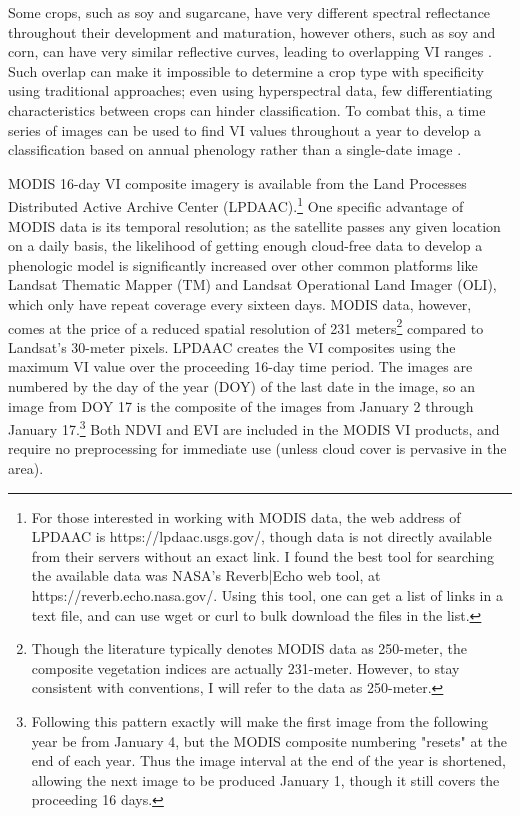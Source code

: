 Some crops, such as soy and sugarcane, have very different spectral reflectance throughout their development and maturation, however others, such as soy and corn, can have very similar reflective curves, leading to overlapping VI ranges \autocite{price1994how-unique}. Such overlap can make it impossible to determine a crop type with specificity using traditional approaches; even using hyperspectral data, few differentiating characteristics between crops can hinder classification. To combat this, a time series of images can be used to find VI values throughout a year to develop a classification based on annual phenology rather than a single-date image \autocites{gu2010phenological}{wardlow2002discriminating}{wardlow2005state-level}{wardlow2007analysis}{wardlow2008large-area}{zhang2003monitoring}.
	
MODIS 16-day VI composite imagery is available from the Land Processes Distributed Active Archive Center (LPDAAC).\footnote{For those interested in working with MODIS data, the web address of LPDAAC is https://lpdaac.usgs.gov/, though data is not directly available from their servers without an exact link. I found the best tool for searching the available data was NASA’s Reverb|Echo web tool, at https://reverb.echo.nasa.gov/. Using this tool, one can get a list of links in a text file, and can use wget or curl to bulk download the files in the list.} One specific advantage of MODIS data is its temporal resolution; as the satellite passes any given location on a daily basis, the likelihood of getting enough cloud-free data to develop a phenologic model is significantly increased over other common platforms like Landsat Thematic Mapper (TM) and Landsat Operational Land Imager (OLI), which only have repeat coverage every sixteen days. MODIS data, however, comes at the price of a reduced spatial resolution of 231 meters\footnote{Though the literature typically denotes MODIS data as 250-meter, the composite vegetation indices are actually 231-meter. However, to stay consistent with conventions, I will refer to the data as 250-meter.} compared to Landsat’s 30-meter pixels. LPDAAC creates the VI composites using the maximum VI value over the proceeding 16-day time period. The images are numbered by the day of the year (DOY) of the last date in the image, so an image from DOY 17 is the composite of the images from January 2 through January 17.\footnote{Following this pattern exactly will make the first image from the following year be from January 4, but the MODIS composite numbering "resets" at the end of each year. Thus the image interval at the end of the year is shortened, allowing the next image to be produced January 1, though it still covers the proceeding 16 days.} Both NDVI and EVI are included in the MODIS VI products, and require no preprocessing for immediate use (unless cloud cover is pervasive in the area).

